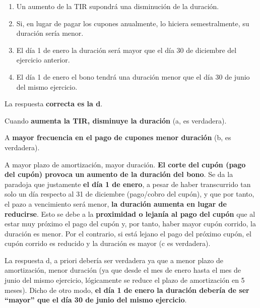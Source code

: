 \documentclass[
  letterpaper,
  DIV=11,
  numbers=noendperiod]{scrreprt}
\begin{document}
\begin{tcolorbox}
\begin{enumerate}
\def\labelenumi{\alph{enumi}.}
\item
  Un aumento de la TIR supondrá una disminución de la duración.
\item
  Si, en lugar de pagar los cupones anualmente, lo hiciera
  semestralmente, su duración sería menor.
\item
  El día 1 de enero la duración será mayor que el día 30 de diciembre
  del ejercicio anterior.
\item
  El día 1 de enero el bono tendrá una duración menor que el día 30 de
  junio del mismo ejercicio.
\end{enumerate}

\begin{tcolorbox}[enhanced jigsaw, toprule=.15mm, left=2mm, arc=.35mm, breakable, bottomrule=.15mm, opacityback=0, rightrule=.15mm, leftrule=.75mm, colframe=quarto-callout-note-color-frame, colback=white]
\begin{minipage}[t]{5.5mm}
\textcolor{quarto-callout-note-color}{\faInfo}
\end{minipage}%
\begin{minipage}[t]{\textwidth - 5.5mm}

La respuesta \textbf{correcta es la d}.

Cuando \textbf{aumenta la TIR, disminuye la duración} (a, es verdadera).

A \textbf{mayor frecuencia en el pago de cupones menor duración} (b, es
verdadera).

A mayor plazo de amortización, mayor duración. \textbf{El corte del
cupón (pago del cupón) provoca un aumento de la duración del bono}. Se
da la paradoja que justamente \textbf{el día 1 de enero}, a pesar de
haber transcurrido tan solo un día respecto al 31 de diciembre
(pago/cobro del cupón), y que por tanto, el pazo a vencimiento será
menor, \textbf{la duración aumenta en lugar de reducirse}. Esto se debe
a la \textbf{proximidad o lejanía al pago del cupón} que al estar muy
próximo el pago del cupón y, por tanto, haber mayor cupón corrido, la
duración es menor. Por el contrario, si está lejano el pago del próximo
cupón, el cupón corrido es reducido y la duración es mayor (c es
verdadera).

La respuesta d, a priori debería ser verdadera ya que a menor plazo de
amortización, menor duración (ya que desde el mes de enero hasta el mes
de junio del mismo ejercicio, lógicamente se reduce el plazo de
amortización en 5 meses). Dicho de otro modo, \textbf{el día 1 de enero
la duración debería de ser ``mayor'' que el día 30 de junio del mismo
ejercicio}.


\end{minipage}
\end{tcolorbox}
\end{tcolorbox}
\end{document}
